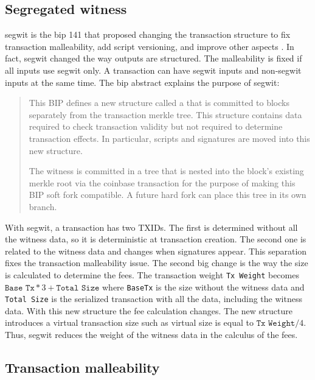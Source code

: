 \subsection{Segregated witness}

\gls{segwit} is the \gls{bip} 141 that proposed changing the transaction
structure to fix transaction malleability, add script versioning, and improve
other aspects \cite{SegWit, SegWitBIP}. In fact, \gls{segwit} changed the way
outputs are structured. The malleability is fixed if all inputs use \gls{segwit}
only. A transaction can have \gls{segwit} inputs and non-\gls{segwit} inputs at
the same time. The \gls{bip} abstract explains the purpose of \gls{segwit}:

\begin{quote}
  This BIP defines a new structure called a  that is committed to
  blocks separately from the transaction merkle tree. This structure contains
  data required to check transaction validity but not required to determine
  transaction effects. In particular, scripts and signatures are moved into this
  new structure.

  The witness is committed in a tree that is nested into the block's existing
  merkle root via the coinbase transaction for the purpose of making this BIP
  soft fork compatible. A future hard fork can place this tree in its own branch.
\end{quote}

With \gls{segwit}, a transaction has two TXIDs. The first is determined without
all the witness data, so it is deterministic at transaction creation. The
second one is related to the witness data and changes when signatures appear.
This separation fixes the transaction malleability issue. The second big change is the
way the size is calculated to determine the fees. The transaction weight
\texttt{Tx Weight} becomes $\texttt{Base Tx} * 3 + \texttt{Total Size}$ where
\texttt{BaseTx} is the size without the witness data and \texttt{Total Size} is
the serialized transaction with all the data, including the witness data. With
this new structure the fee calculation changes. The new structure introduces a
virtual transaction size such as virtual size is equal to $\texttt{Tx Weight} /
4$. Thus, \gls{segwit} reduces the weight of the witness data in the calculus of
the fees.

\subsection{Transaction malleability}

